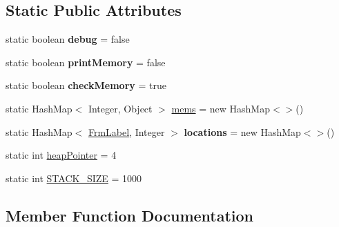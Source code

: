 \subsection*{Static Public Attributes}
\begin{DoxyCompactItemize}
\item 
\mbox{\label{classcompiler_1_1interpreter_1_1_interpreter_af0948e1e0086f8a56ac08c70b9f5a066}} 
static boolean {\bfseries debug} = false
\item 
\mbox{\label{classcompiler_1_1interpreter_1_1_interpreter_a393b1829fd2cb40051c0d5392a9804df}} 
static boolean {\bfseries print\+Memory} = false
\item 
\mbox{\label{classcompiler_1_1interpreter_1_1_interpreter_afae4a26bbe0cbff7d59b41eed20602b4}} 
static boolean {\bfseries check\+Memory} = true
\item 
static Hash\+Map$<$ Integer, Object $>$ \hyperlink{classcompiler_1_1interpreter_1_1_interpreter_a0cf49dd478cf3261b927b4a43b740ea6}{mems} = new Hash\+Map$<$$>$()
\item 
\mbox{\label{classcompiler_1_1interpreter_1_1_interpreter_a217bf563b38822b311a2b3f7b9f0105e}} 
static Hash\+Map$<$ \hyperlink{classcompiler_1_1frames_1_1_frm_label}{Frm\+Label}, Integer $>$ {\bfseries locations} = new Hash\+Map$<$$>$()
\item 
static int \hyperlink{classcompiler_1_1interpreter_1_1_interpreter_a04f07a9f2925a42214b60b8a45a64e8d}{heap\+Pointer} = 4
\item 
static int \hyperlink{classcompiler_1_1interpreter_1_1_interpreter_a9273c146dab3a6f5460420da98994299}{S\+T\+A\+C\+K\+\_\+\+S\+I\+ZE} = 1000
\end{DoxyCompactItemize}


\subsection{Member Function Documentation}
\mbox{\label{classcompiler_1_1interpreter_1_1_interpreter_a63c615f46d843d0d4b4a735952196c8d}} 
